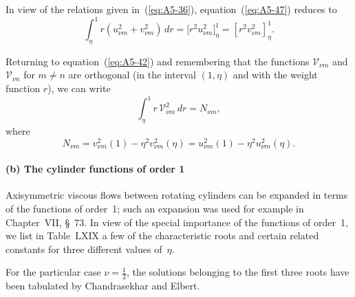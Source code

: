 In view of the relations given in~(\ref{eq:A5-36}), equation~(\ref{eq:A5-47}) reduces to
\begin{equation}
\label{eq:A5-48}
\int_\eta^1 r (u_{\nu m}^2 + v_{\nu m}^2) \, dr = \bigl[r^2 u_{\nu m}^2\bigr]_\eta^1 = [r^2 v_{\nu m}^2]_\eta^1.
\end{equation}

Returning to equation~(\ref{eq:A5-42}) and remembering that the functions $\mathscr{V}_{\nu m}$
and $\mathscr{V}_{\nu n}$ for $m \neq n$ are orthogonal (in the interval $(1,\eta)$ and with the
weight function $r$), we can write
\begin{equation}
\label{eq:A5-49}
\int_\eta^1 r \, \mathscr{V}_{\nu m}^2 \, dr = N_{\nu m},
\end{equation}
where
\begin{equation}
\label{eq:A5-50}
N_{\nu m} = v_{\nu m}^2(1) - \eta^2 v_{\nu m}^2(\eta) = u_{\nu m}^2(1) - \eta^2 u_{\nu m}^2(\eta).
\end{equation}

\paragraph{(b) The cylinder functions of order 1}

Axisymmetric viscous flows between rotating cylinders can be expanded in terms of the functions of order~1; such an expansion was
used for example in Chapter~VII, \S~73. In view of the special importance
of the functions of order~1, we list in Table~LXIX a few of the characteristic roots and certain related constants for three different values
of~$\eta$.

For the particular case $\nu = \frac{1}{2}$, the solutions belonging to the first
three roots have been tabulated by Chandrasekhar and Elbert.

